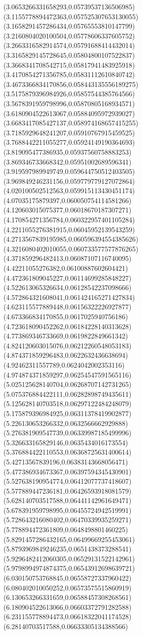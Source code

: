 {(3.0653266331658293,0.05739537136506985)
(3.1155778894472363,0.057525307653130055)
(3.1658291457286434,0.05765553810147799)
(3.2160804020100504,0.05778606337605752)
(3.2663316582914574,0.05791688414432014)
(3.3165829145728645,0.05804800107522837)
(3.3668341708542715,0.05817941483925918)
(3.4170854271356785,0.05831112610840742)
(3.4673366834170856,0.058443135556189275)
(3.5175879396984926,0.05857544385764566)
(3.5678391959798996,0.05870805168934571)
(3.6180904522613067,0.05884095972939027)
(3.6683417085427137,0.058974168657415255)
(3.7185929648241207,0.05910767915459525)
(3.7688442211055277,0.05924149190364693)
(3.819095477386935,0.05937560758883253)
(3.869346733668342,0.05951002689596341)
(3.919597989949749,0.059644750512403505)
(3.969849246231156,0.059779779127072864)
(4.020100502512563,0.059915113430451174)
(4.07035175879397,0.060050754114581266)
(4.120603015075377,0.06018670187307271)
(4.170854271356784,0.060322957401105284)
(4.2211055276381915,0.06045952139543259)
(4.2713567839195985,0.060596394554385626)
(4.3216080402010055,0.060733577577876265)
(4.371859296482413,0.06087107116740095)
(4.42211055276382,0.06100887602604421)
(4.472361809045227,0.06114699285848227)
(4.522613065326634,0.06128542237098666)
(4.572864321608041,0.061424165271427834)
(4.623115577889448,0.06156322226927877)
(4.673366834170855,0.0617025940756186)
(4.723618090452262,0.06184228140313628)
(4.773869346733669,0.0619822849661342)
(4.824120603015076,0.06212260548053183)
(4.874371859296483,0.0622632436638694)
(4.92462311557789,0.0624042002353116)
(4.974874371859297,0.06254547591565116)
(5.025125628140704,0.06268707142731265)
(5.075376884422111,0.06282898749435611)
(5.125628140703518,0.06297122484248079)
(5.175879396984925,0.06311378419902877)
(5.226130653266332,0.0632566662929888)
(5.276381909547739,0.06339987185499996)
(5.326633165829146,0.0635434016173554)
(5.376884422110553,0.06368725631400614)
(5.42713567839196,0.06383143668056471)
(5.477386934673367,0.06397594345430901)
(5.527638190954774,0.06412077737418607)
(5.577889447236181,0.06426593918081579)
(5.628140703517588,0.06441142961649471)
(5.678391959798995,0.06455724942519991)
(5.728643216080402,0.06470339935259271)
(5.778894472361809,0.0648498801460225)
(5.8291457286432165,0.06499669255453061)
(5.8793969849246235,0.0651438373288541)
(5.9296482412060305,0.06529131522142961)
(5.9798994974874375,0.06543912698639721)
(6.030150753768845,0.06558727337960422)
(6.080402010050252,0.06573575515860919)
(6.130653266331659,0.06588457308268561)
(6.180904522613066,0.06603372791282588)
(6.231155778894473,0.06618322041174528)
(6.28140703517588,0.06633305134388566)
}
